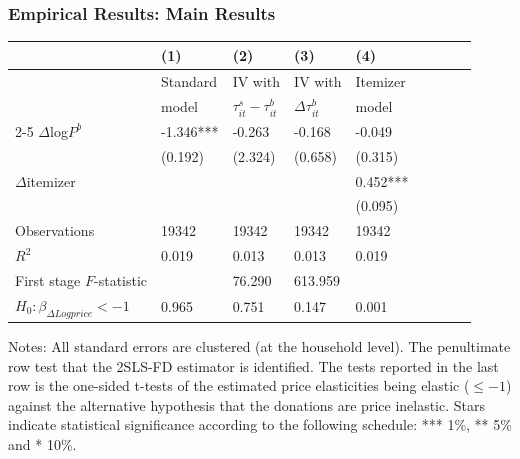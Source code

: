\documentclass[options]{beamer}
\begin{document}
\begin{frame}
	\frametitle{Empirical Results: Main Results}


\begin{table}[H]

	
	\begin{center}
		{\footnotesize \begin{tabular}{l l l l l l l l l}
				
				&         (1)   &         (2)   &         (3)   &         (4)  \\
				\hline
				\hline
				& Standard   &         IV with   &         IV with    &       Itemizer   \\
				&model&$\tau_{it}^{s}-\tau_{it}^{b}$&$\Delta\tau_{it}^{b}$&model\\
				\cline{2-5}
				$\Delta$log$P^{b}$    &      -1.346***&      -0.263   &      -0.168   &      -0.049   \\             &     (0.192)   &     (2.324)   &     (0.658)   &     (0.315)   \\  $\Delta$itemizer     &               &               &               &       0.452***\\             &               &               &               &     (0.095)   \\ \hline
				Observations           &       19342   &       19342   &       19342   &       19342   \\ $R^2$          &       0.019   &       0.013   &       0.013   &       0.019   \\ First stage $F$-statistic          &               &       76.290   &       613.959   &               \\
				$H_{0}:\beta_{\Delta Log price}<-1$ &0.965&0.751&0.147&0.001\\
				
				\hline
				\hline
			\end{tabular}}
		\end{center}
		\begin{tiny}Notes: All standard errors are clustered (at the household level). The penultimate row test that the 2SLS-FD estimator is identified. The tests reported in the last row is the one-sided t-tests of the estimated price elasticities being elastic ($\leq-1$) against the alternative hypothesis that the donations are price inelastic. Stars indicate statistical significance according to the following schedule: *** 1\%, ** 5\% and * 10\%. \end{tiny}
	\end{table}
			\begin{center}
	\end{center}
\end{frame}
\end{document}
